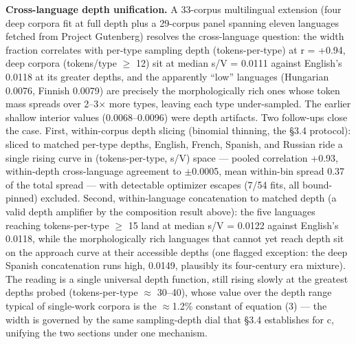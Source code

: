\documentclass[11pt]{article}
\begin{document}
\textbf{Cross-language depth unification.} A 33-corpus multilingual extension (four deep corpora fit at full depth plus a 29-corpus panel spanning eleven languages fetched from Project Gutenberg) resolves the cross-language question: the width fraction correlates with per-type sampling depth (tokens-per-type) at r = +0.94, deep corpora (tokens/type $\ge$ 12) sit at median s/V = 0.0111 against English's 0.0118 at its greater depths, and the apparently ``low'' languages (Hungarian 0.0076, Finnish 0.0079) are precisely the morphologically rich ones whose token mass spreads over 2--3$\times$ more types, leaving each type under-sampled. The earlier shallow interior values (0.0068--0.0096) were depth artifacts. Two follow-ups close the case. First, within-corpus depth slicing (binomial thinning, the \S3.4 protocol): sliced to matched per-type depths, English, French, Spanish, and Russian ride a single rising curve in (tokens-per-type, s/V) space --- pooled correlation +0.93, within-depth cross-language agreement to $\pm$0.0005, mean within-bin spread 0.37 of the total spread --- with detectable optimizer escapes (7/54 fits, all bound-pinned) excluded. Second, within-language concatenation to matched depth (a valid depth amplifier by the composition result above): the five languages reaching tokens-per-type $\ge$ 15 land at median s/V = 0.0122 against English's 0.0118, while the morphologically rich languages that cannot yet reach depth sit on the approach curve at their accessible depths (one flagged exception: the deep Spanish concatenation runs high, 0.0149, plausibly its four-century era mixture). The reading is a single universal depth function, still rising slowly at the greatest depths probed (tokens-per-type $\approx$ 30--40), whose value over the depth range typical of single-work corpora is the $\approx$1.2\% constant of equation (3) --- the width is governed by the same sampling-depth dial that \S3.4 establishes for c, unifying the two sections under one mechanism.
\end{document}
